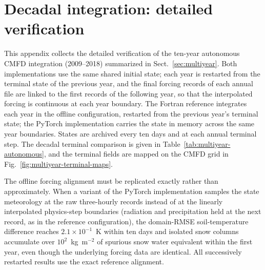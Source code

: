 \appendix

\section{Decadal integration: detailed verification}
\label{app:multiyear}

This appendix collects the detailed verification of the ten-year
autonomous CMFD integration (2009--2018) summarized in
Sect.~\ref{sec:multiyear}. Both implementations use the same shared initial
state; each year is restarted from the terminal state of the previous year,
and the final forcing records of each annual file are linked to the first
records of the following year, so that the interpolated forcing is
continuous at each year boundary. The Fortran reference integrates each year
in the offline configuration, restarted from the previous year's terminal
state; the PyTorch implementation carries the state in memory across the
same year boundaries. States are archived every ten days and at each annual
terminal step. The decadal terminal comparison is given in
Table~\ref{tab:multiyear-autonomous}, and the terminal fields are mapped on
the CMFD grid in Fig.~\ref{fig:multiyear-terminal-maps}.

The offline forcing alignment must be replicated exactly rather than
approximately. When a variant of the PyTorch implementation samples the state meteorology
at the raw three-hourly records instead of at the linearly interpolated
physics-step boundaries (radiation and precipitation held at the next
record, as in the reference configuration), the domain-RMSE soil-temperature
difference reaches $2.1\times10^{-1}$~K within ten days and isolated snow
columns accumulate over $10^{2}$~kg~m$^{-2}$ of spurious snow water
equivalent within the first year, even though the underlying forcing data
are identical. All successively restarted results use the exact reference alignment.

